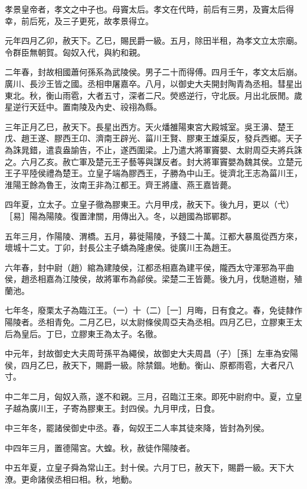 
\begin{pinyinscope}
孝景皇帝者，孝文之中子也。母竇太后。孝文在代時，前后有三男，及竇太后得幸，前后死，及三子更死，故孝景得立。

元年四月乙卯，赦天下。乙巳，賜民爵一級。五月，除田半租，為孝文立太宗廟。令群臣無朝賀。匈奴入代，與約和親。

二年春，封故相國蕭何孫系為武陵侯。男子二十而得傅。四月壬午，孝文太后崩。廣川、長沙王皆之國。丞相申屠嘉卒。八月，以御史大夫開封陶青為丞相。彗星出東北。秋，衡山雨雹，大者五寸，深者二尺。熒惑逆行，守北辰。月出北辰閒。歲星逆行天廷中。置南陵及內史、祋祤為縣。

三年正月乙巳，赦天下。長星出西方。天火燔雒陽東宮大殿城室。吳王濞、楚王戊、趙王遂、膠西王卬、濟南王辟光、菑川王賢、膠東王雄渠反，發兵西鄉。天子為誅晁錯，遣袁盎諭告，不止，遂西圍梁。上乃遣大將軍竇嬰、太尉周亞夫將兵誅之。六月乙亥。赦亡軍及楚元王子藝等與謀反者。封大將軍竇嬰為魏其侯。立楚元王子平陸侯禮為楚王。立皇子端為膠西王，子勝為中山王。徙濟北王志為菑川王，淮陽王餘為魯王，汝南王非為江都王。齊王將廬、燕王嘉皆薨。

四年夏，立太子。立皇子徹為膠東王。六月甲戌，赦天下。後九月，更以（弋）［易］陽為陽陵。復置津關，用傳出入。冬，以趙國為邯鄲郡。

五年三月，作陽陵、渭橋。五月，募徙陽陵，予錢二十萬。江都大暴風從西方來，壞城十二丈。丁卯，封長公主子蟜為隆慮侯。徙廣川王為趙王。

六年春，封中尉（趙）綰為建陵侯，江都丞相嘉為建平侯，隴西太守渾邪為平曲侯，趙丞相嘉為江陵侯，故將軍布為鄃侯。梁楚二王皆薨。後九月，伐馳道樹，殖蘭池。

七年冬，廢栗太子為臨江王。（一）十（二）［一］月晦，日有食之。春，免徒隸作陽陵者。丞相青免。二月乙巳，以太尉條侯周亞夫為丞相。四月乙巳，立膠東王太后為皇后。丁巳，立膠東王為太子。名徹。

中元年，封故御史大夫周苛孫平為繩侯，故御史大夫周昌（子）［孫］左車為安陽侯，四月乙巳，赦天下，賜爵一級。除禁錮。地動。衡山、原都雨雹，大者尺八寸。

中二年二月，匈奴入燕，遂不和親。三月，召臨江王來。即死中尉府中。夏，立皇子越為廣川王，子寄為膠東王。封四侯。九月甲戌，日食。

中三年冬，罷諸侯御史中丞。春，匈奴王二人率其徒來降，皆封為列侯。

中四年三月，置德陽宮。大蝗。秋，赦徒作陽陵者。

中五年夏，立皇子舜為常山王。封十侯。六月丁巳，赦天下，賜爵一級。天下大潦。更命諸侯丞相曰相。秋，地動。


\end{pinyinscope}
